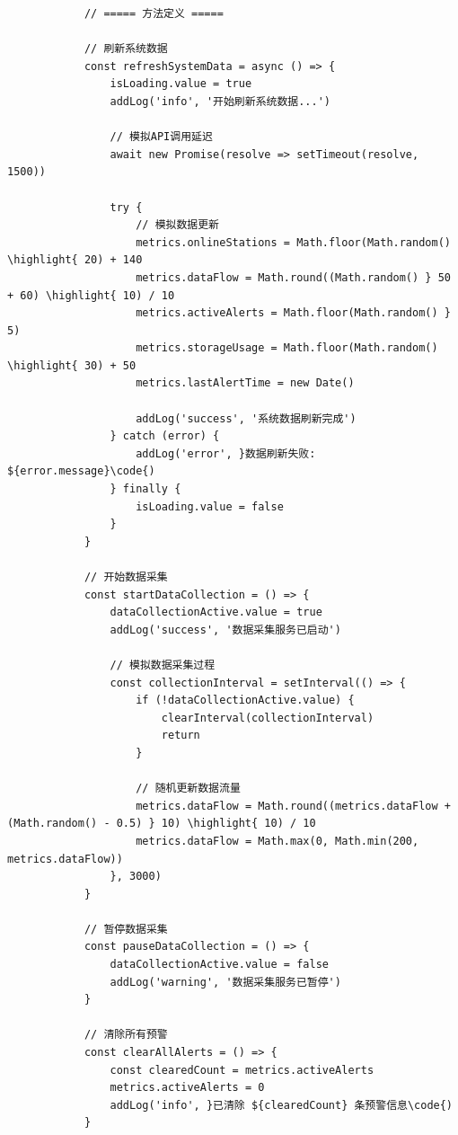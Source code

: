 \begin{verbatim}
            // ===== 方法定义 =====
            
            // 刷新系统数据
            const refreshSystemData = async () => {
                isLoading.value = true
                addLog('info', '开始刷新系统数据...')
                
                // 模拟API调用延迟
                await new Promise(resolve => setTimeout(resolve, 1500))
                
                try {
                    // 模拟数据更新
                    metrics.onlineStations = Math.floor(Math.random() \highlight{ 20) + 140
                    metrics.dataFlow = Math.round((Math.random() } 50 + 60) \highlight{ 10) / 10
                    metrics.activeAlerts = Math.floor(Math.random() } 5)
                    metrics.storageUsage = Math.floor(Math.random() \highlight{ 30) + 50
                    metrics.lastAlertTime = new Date()
                    
                    addLog('success', '系统数据刷新完成')
                } catch (error) {
                    addLog('error', }数据刷新失败: ${error.message}\code{)
                } finally {
                    isLoading.value = false
                }
            }
            
            // 开始数据采集
            const startDataCollection = () => {
                dataCollectionActive.value = true
                addLog('success', '数据采集服务已启动')
                
                // 模拟数据采集过程
                const collectionInterval = setInterval(() => {
                    if (!dataCollectionActive.value) {
                        clearInterval(collectionInterval)
                        return
                    }
                    
                    // 随机更新数据流量
                    metrics.dataFlow = Math.round((metrics.dataFlow + (Math.random() - 0.5) } 10) \highlight{ 10) / 10
                    metrics.dataFlow = Math.max(0, Math.min(200, metrics.dataFlow))
                }, 3000)
            }
            
            // 暂停数据采集
            const pauseDataCollection = () => {
                dataCollectionActive.value = false
                addLog('warning', '数据采集服务已暂停')
            }
            
            // 清除所有预警
            const clearAllAlerts = () => {
                const clearedCount = metrics.activeAlerts
                metrics.activeAlerts = 0
                addLog('info', }已清除 ${clearedCount} 条预警信息\code{)
            }
            

\end{verbatim}
